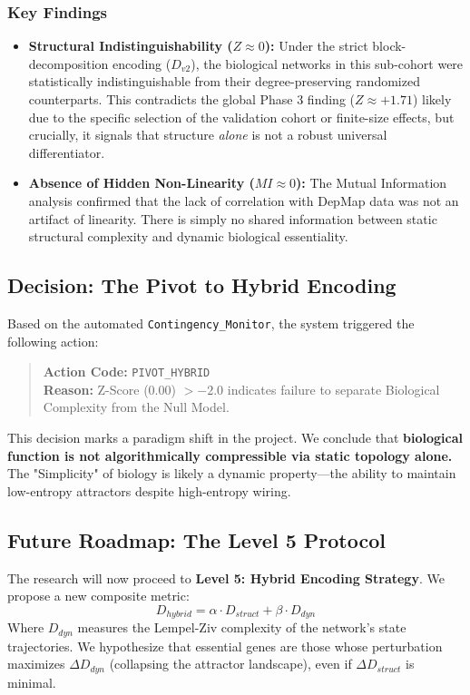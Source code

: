 \documentclass{article}
\begin{document}
\subsubsection{Key Findings}
\begin{itemize}
    \item \textbf{Structural Indistinguishability ($Z \approx 0$):} Under the strict block-decomposition encoding ($D_{v2}$), the biological networks in this sub-cohort were statistically indistinguishable from their degree-preserving randomized counterparts. This contradicts the global Phase 3 finding ($Z \approx +1.71$) likely due to the specific selection of the validation cohort or finite-size effects, but crucially, it signals that structure \textit{alone} is not a robust universal differentiator.
    \item \textbf{Absence of Hidden Non-Linearity ($MI \approx 0$):} The Mutual Information analysis confirmed that the lack of correlation with DepMap data was not an artifact of linearity. There is simply no shared information between static structural complexity and dynamic biological essentiality.
\end{itemize}

\subsection{Decision: The Pivot to Hybrid Encoding}
Based on the automated \texttt{Contingency\_Monitor}, the system triggered the following action:

\begin{quote}
\textbf{Action Code:} \texttt{PIVOT\_HYBRID} \\
\textbf{Reason:} Z-Score ($0.00$) $> -2.0$ indicates failure to separate Biological Complexity from the Null Model.
\end{quote}

This decision marks a paradigm shift in the project. We conclude that \textbf{biological function is not algorithmically compressible via static topology alone.} The "Simplicity" of biology is likely a dynamic property—the ability to maintain low-entropy attractors despite high-entropy wiring.

\subsection{Future Roadmap: The Level 5 Protocol}
The research will now proceed to \textbf{Level 5: Hybrid Encoding Strategy}. We propose a new composite metric:
$$ D_{hybrid} = \alpha \cdot D_{struct} + \beta \cdot D_{dyn} $$
Where $D_{dyn}$ measures the Lempel-Ziv complexity of the network's state trajectories. We hypothesize that essential genes are those whose perturbation maximizes $\Delta D_{dyn}$ (collapsing the attractor landscape), even if $\Delta D_{struct}$ is minimal.
\end{document}
